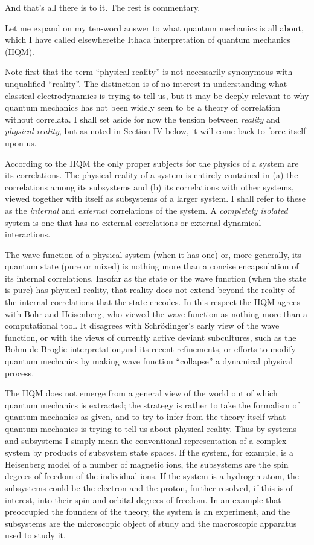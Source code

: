 And that's all there is to it.  The rest is commentary.  


\bigskip
{}
\medskip

Let me expand on my ten-word answer to what quantum mechanics is all
about, which I have called elsewhere\fn the Ithaca interpretation of
quantum mechanics (IIQM).

Note first that the term ``physical reality'' is not necessarily
synonymous with unqualified ``reality''.  The distinction is of no
interest in understanding what classical electrodynamics is trying to
tell us, but it may be deeply relevant to why quantum mechanics has
not been widely seen to be a theory of correlation without correlata.
I shall set aside for now the tension between {\it reality\/} and {\it
physical reality\/}, but as noted in Section IV below, it will come
back to force itself upon us.\fn

According to the IIQM the only proper subjects for the physics of a
system are its correlations.  The physical reality of a system is
entirely contained in (a) the correlations among its subsystems and
(b) its correlations with other systems, viewed together with itself as
subsystems of a larger system.  I shall refer to these as the {\it
internal\/} and {\it external\/} correlations of the system.  A {\it
completely isolated\/} system is one that has no external
correlations or external dynamical interactions.  

The wave function of a physical system (when it has one) or, more
generally, its quantum state (pure or mixed) is nothing more than a
concise encapsulation of its internal correlations.  Insofar as the
state or the wave function (when the state is pure) has physical
reality, that reality does not extend beyond the reality of the
internal correlations that the state encodes.  In this respect the
IIQM agrees with Bohr and Heisenberg, who viewed the wave function as
nothing more than a computational tool.  It disagrees with
Schr\"odinger's early view of the wave function, or with the views of
currently active deviant subcultures, such as the Bohm-de Broglie
interpretation,\fn and its recent refinements, or
efforts to modify quantum mechanics by making wave function
``collapse'' a dynamical physical process.\fn 

The IIQM does not emerge from a general view of the world out of which
quantum mechanics is extracted; the strategy is rather to take the
formalism of quantum mechanics as given, and to try to infer from the
theory itself what quantum mechanics is trying to tell us about
physical reality.  Thus by systems and subsystems I simply mean the
conventional representation of a complex system by products of
subsystem state spaces. If the system, for example, is a Heisenberg
model of a number of magnetic ions, the subsystems are the spin
degrees of freedom of the individual ions.  If the system is a
hydrogen atom, the subsystems could be the electron and the proton,
further resolved, if this is of interest, into their spin and orbital
degrees of freedom.  In an example that preoccupied the founders of
the theory, the system is an experiment, and the subsystems are the
microscopic object of study and the macroscopic apparatus used to
study it.

